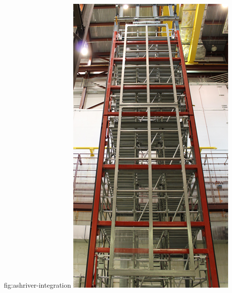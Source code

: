 \begin{dunefigure}{fig:ashriver-integration}
\includegraphics[height=0.5\textheight]{graphics/sp-apa-ash-river-doublet.png} 
\end{dunefigure}